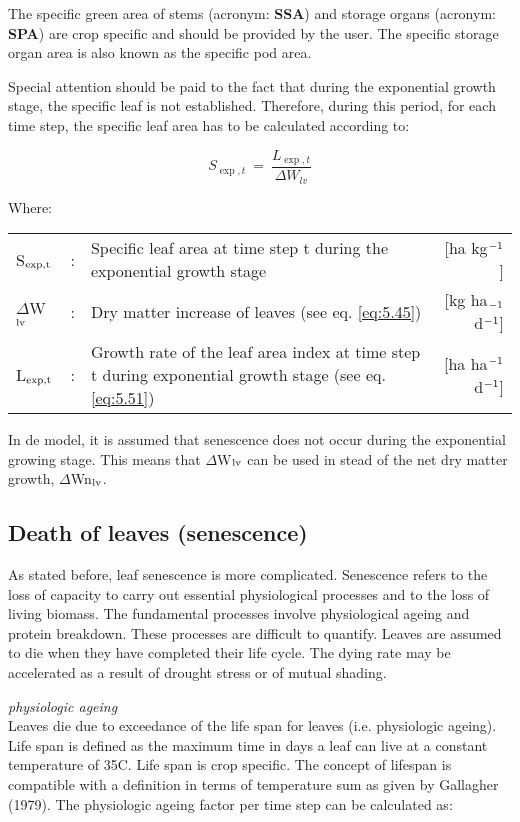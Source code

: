 The specific green area of stems (acronym: {\bf SSA}) and storage organs (acronym: {\bf SPA}) are
crop specific and should be provided by the user. The specific storage organ area is also
known as the specific pod area.

Special attention should be paid to the fact that during the exponential growth stage, the
specific leaf is not established. Therefore, during this period, for each time step, the
specific leaf area has to be calculated according to:

\begin{equation}
S_{\exp,t} ~=~ {\frac{L_{\exp,t}}{\Delta W_{lv} }}
\end{equation}

Where:\\[5pt]
\begin{tabularx}{\textwidth}{llXr}
	S$_{{\rm exp,t}}$ &:& Specific leaf area at time step t during the 
	exponential growth stage    &     [ha kg$^{{\rm -1}}$]\\
	$\Delta$W$_{{\rm lv}}$ &:& Dry matter increase of leaves (see eq. \ref{eq:5.45})   &
	[kg ha$_{{\rm -1}}$ d$^{{\rm -1}}$]\\
	L$_{{\rm \exp,t}}$ &:& Growth rate of the leaf area index at time step t
	during exponential growth stage (see eq. \ref{eq:5.51})   &
	[ha ha$^{{\rm -1}}$ d$^{{\rm -1}}$]\\
\end{tabularx}

In de model, it is assumed that senescence does not occur during the exponential growing
stage. This means that $\Delta$W$_{{\rm lv}}$ can be used in stead of the net dry matter 
growth, $\Delta$Wn$_{{\rm lv}}$.

\subsection{Death of leaves (senescence)}
As stated before, leaf senescence is more complicated. Senescence refers to the loss of
capacity to carry out essential physiological processes and to the loss of living biomass.
The fundamental processes involve physiological ageing and protein breakdown. These
processes are difficult to quantify. Leaves are assumed to die when they have completed
their life cycle. The dying rate may be accelerated as a result of drought stress or of
mutual shading.

{\it physiologic ageing}\\
Leaves die due to exceedance of the life span for leaves (i.e. physiologic ageing). Life
span is defined as the maximum time in days a leaf can live at a constant temperature of
35\textdegree C. Life span is crop specific. The concept of lifespan is compatible with a definition
in terms of temperature sum as given by Gallagher (1979).
The physiologic ageing factor per time step can be calculated as:

